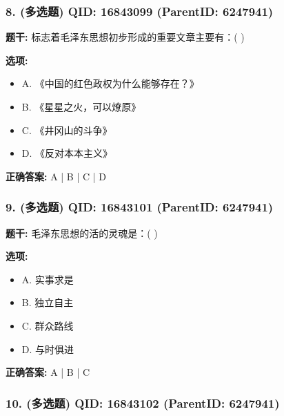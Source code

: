 \documentclass[12pt,UTF8]{ctexart}
\begin{document}
\subsubsection*{8. (多选题) \small QID: 16843099 (ParentID: 6247941)}

\textbf{题干:}
标志着毛泽东思想初步形成的重要文章主要有：( )



\textbf{选项:}
\begin{itemize}[leftmargin=*]

  \item A. 《中国的红色政权为什么能够存在？》

  \item B. 《星星之火，可以燎原》

  \item C. 《井冈山的斗争》

  \item D. 《反对本本主义》

\end{itemize}

\textbf{正确答案:}
A | B | C | D

\vspace{0.3em}\hrulefill\vspace{0.7em}

\subsubsection*{9. (多选题) \small QID: 16843101 (ParentID: 6247941)}

\textbf{题干:}
毛泽东思想的活的灵魂是：( )



\textbf{选项:}
\begin{itemize}[leftmargin=*]

  \item A. 实事求是

  \item B. 独立自主

  \item C. 群众路线

  \item D. 与时俱进

\end{itemize}

\textbf{正确答案:}
A | B | C

\vspace{0.3em}\hrulefill\vspace{0.7em}

\subsubsection*{10. (多选题) \small QID: 16843102 (ParentID: 6247941)}
\end{document}

